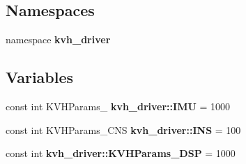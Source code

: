 \subsection*{\-Namespaces}
\begin{DoxyCompactItemize}
\item 
namespace {\bf kvh\-\_\-driver}
\end{DoxyCompactItemize}
\subsection*{\-Variables}
\begin{DoxyCompactItemize}
\item 
const int \-K\-V\-H\-Params\-\_ {\bf kvh\-\_\-driver\-::\-I\-M\-U} = 1000
\item 
const int \-K\-V\-H\-Params\-\_\-\-C\-N\-S {\bf kvh\-\_\-driver\-::\-I\-N\-S} = 100
\item 
const int {\bf kvh\-\_\-driver\-::\-K\-V\-H\-Params\-\_\-\-D\-S\-P} = 1000
\end{DoxyCompactItemize}
